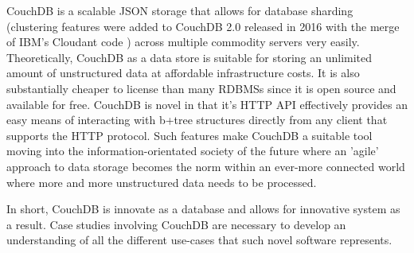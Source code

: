 CouchDB is a scalable JSON storage that allows for database sharding (clustering features were added to CouchDB 2.0 released in 2016 with the merge of IBM's Cloudant code \cite{couchdb2.0}) across multiple commodity servers very easily. Theoretically, CouchDB as a data store is suitable for storing an unlimited amount of unstructured data at affordable infrastructure costs. It is also substantially cheaper to license than many RDBMSs since it is open source and available for free. CouchDB is novel in that it's HTTP API effectively provides an easy means of interacting with b+tree structures directly from any client that supports the HTTP protocol. Such features make CouchDB a suitable tool moving into the information-orientated society of the future where an 'agile' approach to data storage becomes the norm within an ever-more connected world where more and more unstructured data needs to be processed.

In short, CouchDB is innovate as a database and allows for innovative system as a result. Case studies involving CouchDB are necessary to develop an understanding of all the different use-cases that such novel software represents.